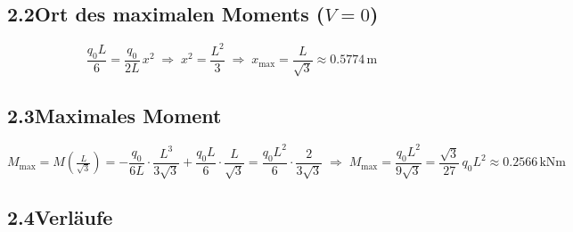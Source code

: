 \documentclass[a4paper,11pt]{article}
\begin{document}
\subsection*{2.2\quad Ort des maximalen Moments ($V = 0$)}

\[
  \frac{q_0 L}{6} = \frac{q_0}{2L}\,x^2
  \;\Rightarrow\; x^2 = \frac{L^2}{3}
  \;\Rightarrow\; \boxed{x_{\max} = \frac{L}{\sqrt{3}} \approx 0.5774\,\text{m}}
\]

\subsection*{2.3\quad Maximales Moment}

\[
  M_{\max} = M\!\left(\tfrac{L}{\sqrt{3}}\right)
  = -\frac{q_0}{6L}\cdot\frac{L^3}{3\sqrt{3}} + \frac{q_0 L}{6}\cdot\frac{L}{\sqrt{3}}
  = \frac{q_0 L^2}{6}\cdot\frac{2}{3\sqrt{3}}
  \;\Rightarrow\;
  \boxed{M_{\max} = \frac{q_0 L^2}{9\sqrt{3}}
         = \frac{\sqrt{3}}{27}\,q_0 L^2 \approx 0.2566\,\text{kNm}}
\]

\subsection*{2.4\quad Verläufe}
\end{document}
